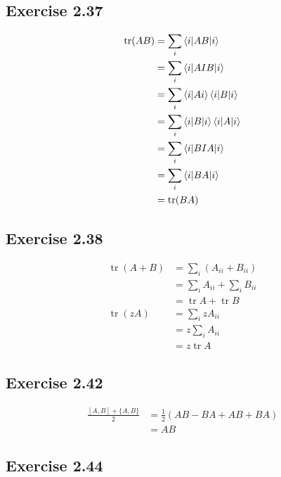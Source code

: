 \documentclass{article}
\newcommand{\tr}{\operatorname{tr}}
\begin{document}
\subsection*{Exercise 2.37}

\begin{align*}
  \tr (A B) & = \sum_i \braket{i | A B | i}                  \\
            & = \sum_i \braket{i | A I B | i}                \\
            & = \sum_i \braket{i | A i} \braket{i | B | i}   \\
            & = \sum_i \braket{i | B | i} \braket{i | A | i} \\
            & = \sum_i \braket{i | B I A | i}                \\
            & = \sum_i \braket{i | B A | i}                  \\
            & = \tr (B A)
\end{align*}

\subsection*{Exercise 2.38}

\begin{align*}
  \tr (A + B) & = \sum_i (A_{ii} + B_{ii})      \\
              & = \sum_i A_{ii} + \sum_i B_{ii} \\
              & = \tr A + \tr B                 \\
  \tr (z A)   & = \sum_i z A_{ii}               \\
              & = z \sum_i A_{ii}               \\
              & = z \tr A
\end{align*}

\subsection*{Exercise 2.42}

\begin{align*}
  \frac{[A, B] + \{A, B\}}{2} & = \frac{1}{2} (A B - B A + A B + B A) \\
                              & = A B
\end{align*}

\subsection*{Exercise 2.44}
\end{document}
